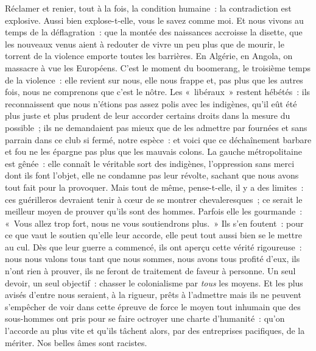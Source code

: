 \documentclass[french,twoside]{book} %
\begin{document}
Réclamer et renier, tout à la fois, la condition humaine : la contradiction est explosive. Aussi bien explose-t-elle, vous le   savez comme moi. Et nous vivons au temps de la déflagration : que la montée des naissances accroisse la disette, que les nouveaux venus aient à redouter de vivre un peu plus que de mourir, le torrent de la violence emporte toutes les barrières. En Algérie, en Angola, on massacre à vue les Européens. C’est le moment du boomerang, le troisième temps de la violence : elle revient sur nous, elle nous frappe et, pas plus que les autres fois, nous ne comprenons que c’est le nôtre. Les « libéraux » restent hébétés : ils reconnaissent que nous n’étions pas assez polis avec les indigènes, qu’il eût été plus juste et plus prudent de leur accorder certains droits dans la mesure du possible ; ils ne demandaient pas mieux que de les admettre par fournées et sans parrain dans ce club si fermé, notre espèce : et voici que ce déchaînement barbare et fou ne les épargne pas plus que les mauvais colons. La gauche métropolitaine est gênée : elle connaît le véritable sort des indigènes, l’oppression sans merci dont ils font l’objet, elle ne condamne pas leur révolte, sachant que nous avons tout fait pour la provoquer. Mais tout de même, pense-t-elle, il y a des limites : ces guérilleros devraient tenir à cœur de se montrer chevaleresques ; ce serait le meilleur moyen de prouver qu’ils sont des hommes. Parfois elle les gourmande : « Vous allez trop fort, nous ne vous soutiendrons plus. » Ils s’en foutent : pour ce que vaut le soutien qu’elle leur accorde, elle peut tout aussi bien se le mettre au cul. Dès que leur guerre a commencé, ils ont aperçu cette vérité rigoureuse : nous nous valons tous tant que nous sommes, nous avons tous profité d’eux, ils n’ont rien à prouver, ils ne feront de traitement de faveur à personne. Un seul devoir, un seul objectif : chasser le colonialisme par \emph{tous} les moyens. Et les plus avisés d’entre nous seraient, à la rigueur, prêts à l’admettre mais ils ne peuvent s’empêcher de voir dans cette épreuve de force le moyen tout inhumain que des sous-hommes ont pris pour se faire octroyer une charte d’humanité : qu’on l’accorde au plus vite et qu’ils tâchent alors, par des entreprises pacifiques, de la mériter. Nos belles âmes sont racistes.\par
\end{document}
